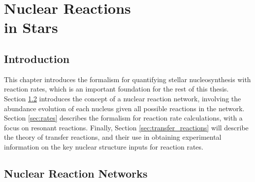 \chapter[Nuclear Reactions in Stars]{\textbf{Nuclear Reactions \\ in Stars}}
\label{ch:reactions}

\section{Introduction}


This chapter introduces the formalism for quantifying stellar nucleosynthesis with reaction rates, which is an important foundation for the rest of this thesis. Section \ref{sec:nuc_reac_network} introduces the concept of a nuclear reaction network, involving the abundance evolution of each nucleus given all possible reactions in the network. Section \ref{sec:rates} describes the formalism for reaction rate calculations, with a focus on resonant reactions. Finally, Section \ref{sec:transfer_reactions} will describe the theory of transfer reactions, and their use in obtaining experimental information on the key nuclear structure inputs for reaction rates.


\section{Nuclear Reaction Networks} \label{sec:nuc_reac_network}


